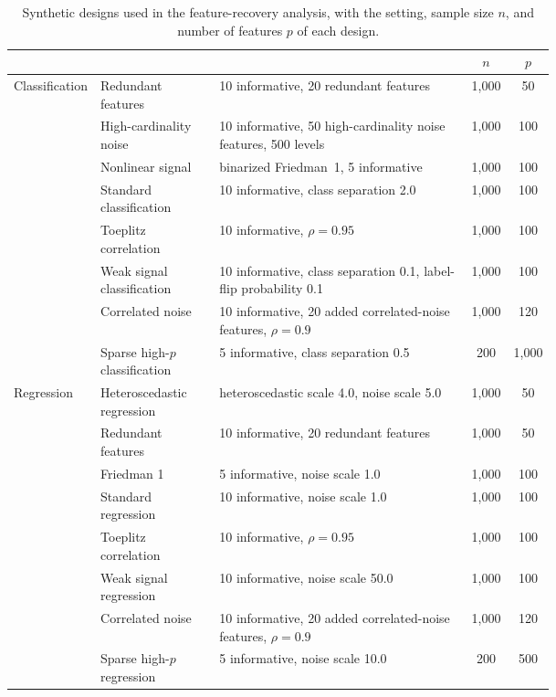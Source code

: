 \begin{table}[tb]
  \centering
  \scriptsize
  \setlength{\tabcolsep}{4pt}
  \begin{tabular}{@{}lL{0.22\linewidth}L{0.47\linewidth}S[table-format=4.0]S[table-format=4.0]@{}}
    \toprule
     &  &  & {$n$} & {$p$} \\
    \midrule
    Classification & Redundant features & 10 informative, 20 redundant features & 1,000 & 50 \\
     & High-cardinality noise & 10 informative, 50 high-cardinality noise features, 500 levels & 1,000 & 100 \\
     & Nonlinear signal & binarized Friedman~1, 5 informative & 1,000 & 100 \\
     & Standard classification & 10 informative, class separation 2.0 & 1,000 & 100 \\
     & Toeplitz correlation & 10 informative, $\rho = 0.95$ & 1,000 & 100 \\
     & Weak signal classification & 10 informative, class separation 0.1, label-flip probability 0.1 & 1,000 & 100 \\
     & Correlated noise & 10 informative, 20 added correlated-noise features, $\rho = 0.9$ & 1,000 & 120 \\
     & Sparse high-$p$ classification & 5 informative, class separation 0.5 & 200 & 1,000 \\
    \addlinespace
    Regression & Heteroscedastic regression & heteroscedastic scale 4.0, noise scale 5.0 & 1,000 & 50 \\
     & Redundant features & 10 informative, 20 redundant features & 1,000 & 50 \\
     & Friedman 1 & 5 informative, noise scale 1.0 & 1,000 & 100 \\
     & Standard regression & 10 informative, noise scale 1.0 & 1,000 & 100 \\
     & Toeplitz correlation & 10 informative, $\rho = 0.95$ & 1,000 & 100 \\
     & Weak signal regression & 10 informative, noise scale 50.0 & 1,000 & 100 \\
     & Correlated noise & 10 informative, 20 added correlated-noise features, $\rho = 0.9$ & 1,000 & 120 \\
     & Sparse high-$p$ regression & 5 informative, noise scale 10.0 & 200 & 500 \\
    \bottomrule
  \end{tabular}
  \caption{Synthetic designs used in the feature-recovery analysis, with the
  setting, sample size $n$, and number of features $p$ of each design.}
  \label{tab:synthetic-dataset-inventory-clf}
\end{table}
